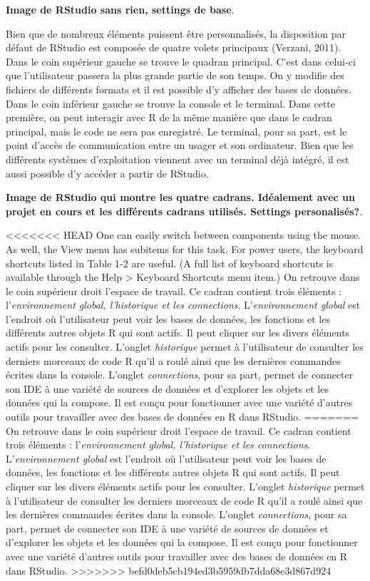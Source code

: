 \documentclass[
  letterpaper,
]{scrbook}
\begin{document}
\textbf{Image de RStudio sans rien, settings de base}.

Bien que de nombreux éléments puissent être personnalisés, la
disposition par défaut de RStudio est composée de quatre volets
principaux (Verzani, 2011). Dans le coin supérieur gauche se trouve le
quadran principal. C'est dans celui-ci que l'utilisateur passera la plus
grande partie de son temps. On y modifie des fichiers de différents
formats et il est possible d'y afficher des bases de données. Dans le
coin inférieur gauche se trouve la console et le terminal. Dans cette
première, on peut interagir avec R de la même manière que dans le cadran
principal, mais le code ne sera pas enregistré. Le terminal, pour sa
part, est le point d'accès de communication entre un usager et son
ordinateur. Bien que les différents systèmes d'exploitation viennent
avec un terminal déjà intégré, il est aussi possible d'y accéder a
partir de RStudio.

\textbf{Image de RStudio qui montre les quatre cadrans. Idéalement avec
un projet en cours et les différents cadrans utilisés. Settings
personalisés?}.

<<<<<<< HEAD
One can easily switch between components using the mouse. As well, the
View menu has subitems for this task. For power users, the keyboard
shortcuts listed in Table 1-2 are useful. (A full list of keyboard
shortcuts is available through the Help \textgreater{} Keyboard
Shortcuts menu item.) On retrouve dans le coin supérieur droit l'espace
de travail. Ce cadran contient trois éléments : l'\emph{environnement
global, l'historique et les connections}. L'\emph{environnement global}
est l'endroit où l'utilisateur peut voir les bases de données, les
fonctions et les différents autres objets R qui sont actifs. Il peut
cliquer sur les divers éléments actifs pour les consulter. L'onglet
\emph{historique} permet à l'utilisateur de consulter les derniers
morceaux de code R qu'il a roulé ainsi que les dernières commandes
écrites dans la console. L'onglet \emph{connections}, pour sa part,
permet de connecter son IDE à une variété de sources de données et
d'explorer les objets et les données qui la compose. Il est conçu pour
fonctionner avec une variété d'autres outils pour travailler avec des
bases de données en R dans RStudio.
=======
On retrouve dans le coin supérieur droit l'espace de travail. Ce cadran
contient trois éléments : l'\emph{environnement global, l'historique et
les connections}. L'\emph{environnement global} est l'endroit où
l'utilisateur peut voir les bases de données, les fonctions et les
différents autres objets R qui sont actifs. Il peut cliquer sur les
divers éléments actifs pour les consulter. L'onglet \emph{historique}
permet à l'utilisateur de consulter les derniers morceaux de code R
qu'il a roulé ainsi que les dernières commandes écrites dans la console.
L'onglet \emph{connections}, pour sa part, permet de connecter son IDE à
une variété de sources de données et d'explorer les objets et les
données qui la compose. Il est conçu pour fonctionner avec une variété
d'autres outils pour travailler avec des bases de données en R dans
RStudio.
>>>>>>> befd0deb5cb194ed3b5959db7dda68e3d867d924
\end{document}

